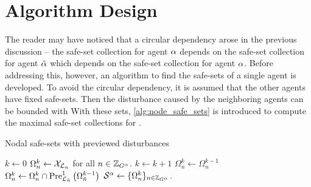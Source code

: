 \section{Algorithm Design}
The reader may have noticed that a circular dependency arose in the previous discussion -- the safe-set collection for agent $\alpha$ depends on the safe-set collection for agent ${\tilde{\alpha}}$ which depends on the safe-set collection for agent $\alpha$. Before addressing this, however, an algorithm to find the safe-sets of a single agent is developed. To avoid the circular dependency, it is assumed that the other agents have fixed safe-sets. Then the disturbance caused by the neighboring agents can be bounded with
With these sets, \autoref{alg:node_safe_sets} is introduced to compute the maximal safe-set collections for . 
\begin{algorithm}[h]
\caption{Nodal safe-sets with previewed disturbances}\label{alg:node_safe_sets}
\begin{algorithmic}[1]
\State $k\gets0$
\State $\Omega_{n}^k\gets\xcon[\gnodelabel{n}]$ for all $n\in\idxset{\gnumnodes[\agentidx]}$.
\Repeat 
	\State $k\gets k+1$
		\State $\Omega_{n}^k\gets\Omega_{n}^{k-1}$
				\State $\Omega_{n}^k\gets\Omega_{n}^k\cap\PreviewedPre[\gnodelabel{\tilde{n}}][1]{\Omega_{\tilde{n}}^{k-1}}$
			\EndFor
	\EndFor
{}
\State $\safeset{}^\agentidx\gets\{\Omega_{n}^k\}_{n\in\idxset{\gnumnodes[\agentidx]}}$.\;
\EndProcedure
\end{algorithmic}
\end{algorithm}

